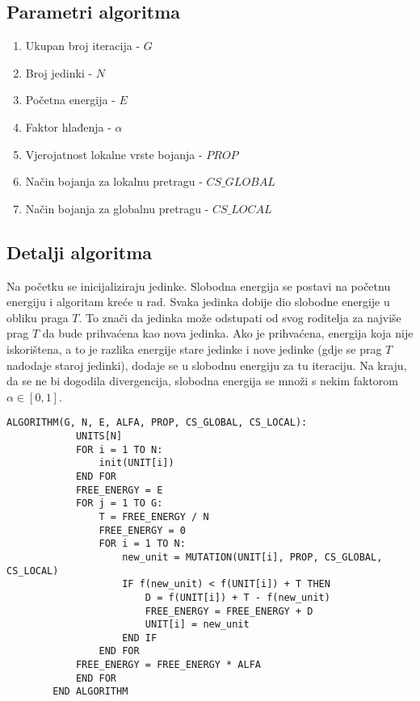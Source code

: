 \documentclass[times, utf8, diplomski, numeric]{fer}
\begin{document}
\subsection{Parametri algoritma}

\begin{enumerate}
	\item Ukupan broj iteracija - $G$
	\item Broj jedinki - $N$
	\item Početna energija - $E$
	\item Faktor hlađenja - $\alpha$
	\item Vjerojatnost lokalne vrste bojanja - $PROP$
	\item Način bojanja za lokalnu pretragu - $CS\_GLOBAL$
	\item Način bojanja za globalnu pretragu - $CS\_LOCAL$
\end{enumerate}


\subsection{Detalji algoritma}

Na početku se inicijaliziraju jedinke. Slobodna energija se postavi na početnu energiju i algoritam kreće u rad. Svaka jedinka dobije dio slobodne energije u obliku praga $T$. To znači da jedinka može odstupati od svog roditelja za najviše prag $T$ da bude prihvaćena kao nova jedinka. Ako je prihvaćena, energija koja nije iskorištena, a to je razlika energije stare jedinke i nove jedinke (gdje se prag $T$ nadodaje staroj jedinki), dodaje se u slobodnu energiju za tu iteraciju. Na kraju, da se ne bi dogodila divergencija, slobodna energija se množi s nekim faktorom $\alpha \in [0,1]$.  

\begin{singlespace}
	\begin{lstlisting}[caption=Pseudok\^{o}d genetskog kaljenja]
		ALGORITHM(G, N, E, ALFA, PROP, CS_GLOBAL, CS_LOCAL):
			UNITS[N]
			FOR i = 1 TO N:
				init(UNIT[i])
			END FOR
			FREE_ENERGY = E
			FOR j = 1 TO G:
				T = FREE_ENERGY / N
				FREE_ENERGY = 0
				FOR i = 1 TO N:
					new_unit = MUTATION(UNIT[i], PROP, CS_GLOBAL, CS_LOCAL)
					IF f(new_unit) < f(UNIT[i]) + T THEN
						D = f(UNIT[i]) + T - f(new_unit)
						FREE_ENERGY = FREE_ENERGY + D
						UNIT[i] = new_unit
					END IF
				END FOR
			FREE_ENERGY = FREE_ENERGY * ALFA
			END FOR
		END ALGORITHM
	\end{lstlisting}
\end{singlespace}
\end{document}
